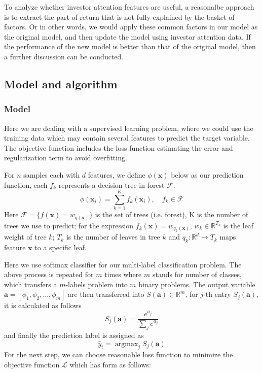 \documentclass[letterpaper]{article}
\begin{document}
To analyze whether investor attention features are useful, a reasonalbe approach is to extract the part of return that is not fully explained by the basket of factors. Or in other words, we would apply these common factors in our model as the original model, and then update the model using investor attention data. If the performance of the new model is better than that of the original model, then a further discussion can be conducted. 

\subsection{Model and algorithm}

\subsubsection{Model}

Here we are dealing with a supervised learning problem, where we could use the training data which may contain several features to predict the target variable. 
The objective function includes the loss function estimating the error and regularization term to avoid overfitting. 

For $n$ samples each with $d$ features, we define $\phi(\bm{x})$ below as our prediction function, each $f_k$ represents a decision tree in forest $\mathcal{F}$.
$$
\phi(\bm{x}_{i}) = \sum_{k = 1}^{K} f_{k}(\bm{x}_{i}),\quad f_{k} \in \mathcal{F}
$$
Here $\mathcal{F} = \{ f(\bm{x}) = w_{q(\bm{x})} \}$ is the set of trees (i.e. forest), K is the number of trees we use to predict; for the expression $f_{k}(\bm{x})=w_{q_{k}(\bm{x})}$, $w_{k}\in \mathbb{R}^{T_{k}}$ is the leaf weight of tree $k$; $T_{k}$ is the number of leaves in tree $k$ and $q_{k}: \mathbb{R}^d \rightarrow T_{k}$ maps feature $\bm{x}$ to a specific leaf.

Here we use softmax classifier for our multi-label classification problem. The above process is repeated for $m$ times where $m$ stands for number of classes, which transfers a $m$-labels problem into $m$ binary problems. The output variable $\bm{a}=[\phi_{1},\phi_{2},...,\phi_{m}]$ are then transferred into $S(\bm{a})\in\mathbb{R}^{m}$, for $j$-th entry $S_{j}(\bm{a})$, it is calculated as follows
$$
S_{j}(\bm{a}) = \frac{e^{a_{j}}}{\sum_{j}e^{a_{j}}}
$$
and finally the prediction label is assigned as
$$
\hat{y}_{i}=\mathop{\arg\max}_{j} S_{j}(\bm{a})
$$
For the next step, we can choose reasonable loss function to minimize the objective function $\mathcal{L}$ which has form as follows:
\end{document}
